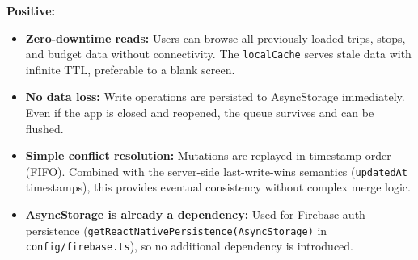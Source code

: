 \documentclass[12pt, a4paper]{article}
\newcommand{\code}[1]{\texttt{\small #1}}
\begin{document}
\begin{tcolorbox}[adrbox]
\textbf{Positive:}
\begin{itemize}
  \item \textbf{Zero-downtime reads:} Users can browse all previously loaded trips, stops, and budget data without connectivity. The \code{localCache} serves stale data with infinite TTL, preferable to a blank screen.
  \item \textbf{No data loss:} Write operations are persisted to AsyncStorage immediately. Even if the app is closed and reopened, the queue survives and can be flushed.
  \item \textbf{Simple conflict resolution:} Mutations are replayed in timestamp order (FIFO). Combined with the server-side last-write-wins semantics (\code{updatedAt} timestamps), this provides eventual consistency without complex merge logic.
  \item \textbf{AsyncStorage is already a dependency:} Used for Firebase auth persistence (\code{getReactNativePersistence(AsyncStorage)} in \code{config/firebase.ts}), so no additional dependency is introduced.
\end{itemize}


\end{tcolorbox}
\end{document}
